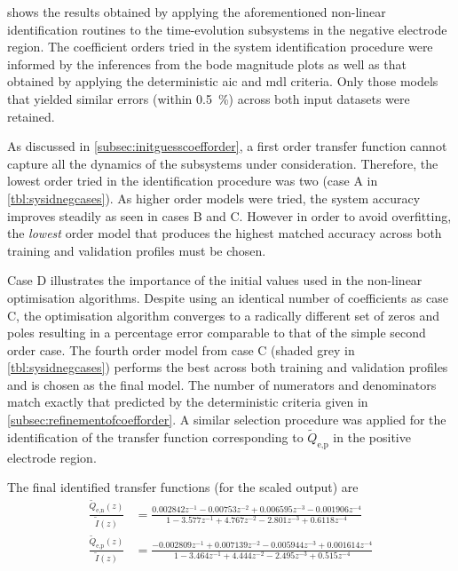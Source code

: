    shows   the   results  obtained   by   applying   the
aforementioned   non-linear  identification   routines  to   the  time-evolution
subsystems in the negative electrode region. The coefficient orders tried in the
system identification  procedure were informed  by the inferences from  the bode
magnitude plots as well as that obtained by applying the deterministic \gls{aic}
and \gls{mdl}  criteria. Only those  models that yielded similar  errors (within
\SI{0.5}{\percent}) across both input datasets were retained.

As  discussed  in \cref{subsec:initguesscoefforder},   a  first  order  transfer
function cannot capture all the  dynamics of the subsystems under consideration.
Therefore, the lowest order tried in  the identification procedure was two (case
A in \cref{tbl:sysidnegcases}).  As higher order  models were tried,  the system
accuracy improves steadily as  seen in cases B and C. However  in order to avoid
overfitting, the  \emph{lowest} order  model that  produces the  highest matched
accuracy across both training and validation profiles must be chosen.

Case D illustrates  the importance of the initial values  used in the non-linear
optimisation algorithms.  Despite using an  identical number of  coefficients as
case C,  the optimisation algorithm  converges to  a radically different  set of
zeros  and  poles  resulting  in  a  percentage  error  comparable  to  that  of
the  simple second  order  case. The  fourth  order model  from  case C  (shaded
grey  in \cref{tbl:sysidnegcases}) performs  the best  across both  training and
validation profiles and  is chosen as the final model.  The number of numerators
and  denominators match  exactly that  predicted by  the deterministic  criteria
given in \cref{subsec:refinementofcoefforder}. A similar selection procedure was
applied  for  the  identification  of the  transfer  function  corresponding  to
$\widetilde{Q}_{\text{e,p}}$ in the positive electrode region.

The final identified transfer functions (for the scaled output) are
\begin{align}
    \frac{\widetilde{Q}_{\text{e,n}}(z)}{\widetilde{I}(z)} & = \frac{0.002842 z^{-1} - 0.00753 z^{-2} + 0.006595 z^{-3} - 0.001906 z^{-4}}{1 - 3.577 z^{-1} + 4.767 z^{-2} - 2.801 z^{-3} + 0.6118 z^{-4}} \label{eq:finaldisctfneg}\\
    \frac{\widetilde{Q}_{\text{e,p}}(z)}{\widetilde{I}(z)} & = \frac{-0.002809 z^{-1} + 0.007139 z^{-2} - 0.005944 z^{-3} + 0.001614 z^{-4}}{1 - 3.464 z^{-1} + 4.444 z^{-2} - 2.495 z^{-3} + 0.515 z^{-4}}\label{eq:finaldisctfpos}
\end{align}

